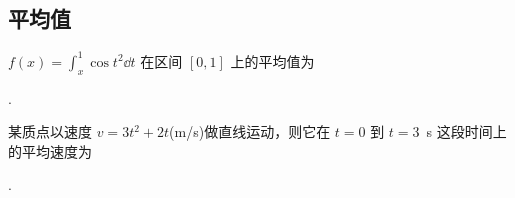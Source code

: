 \subsection{平均值}

	\begin{ti}
		$f(x) = \int_{x}^{1} \cos t^{2} \dd{t}$ 在区间 $[0,1]$ 上的平均值为
		
		\noindent{}.
	\end{ti}

	\begin{ti}
		某质点以速度 $v = 3t^{2} + 2t$(\si{m/s})做直线运动，则它在 $t = 0$ 到 $t = $\SI{3}{s} 这段时间上的平均速度为\htwo
		
		\noindent\hone{2}.
	\end{ti}